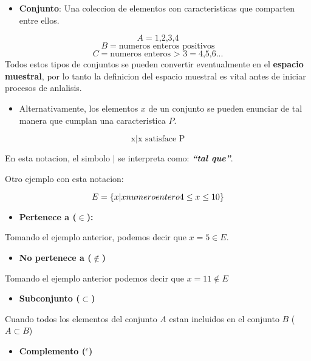 \documentclass[]{book}
\providecommand{\tightlist}{%
  \setlength{\itemsep}{0pt}\setlength{\parskip}{0pt}}
\begin{document}
\begin{itemize}
\tightlist
\item
  \textbf{Conjunto}: Una coleccion de elementos con caracteristicas que
  comparten entre ellos.
\end{itemize}

\[A=\text{{1,2,3,4}}\] \[B = \text{{numeros enteros positivos}}\]
\[ C = \text{{numeros enteros > 3}} = \text{{4,5,6...}}\] Todos estos
tipos de conjuntos se pueden convertir eventualmente en el
\textbf{espacio muestral}, por lo tanto la definicion del espacio
muestral es vital antes de iniciar procesos de anlalisis.

\begin{itemize}
\tightlist
\item
  Alternativamente, los elementos \(x\) de un conjunto se pueden
  enunciar de tal manera que cumplan una caracteristica \(P\).
\end{itemize}

\[\text{{x|x satisface P}}\]

En esta notacion, el simbolo \emph{\(|\)} se interpreta como:
\textbf{\emph{``tal que''}}.

Otro ejemplo con esta notacion:

\[ E = \{x|x \space numero\space entero\space 4 \leq x \leq 10\}\]

\begin{itemize}
\tightlist
\item
  \textbf{Pertenece a (\(\in\)):}
\end{itemize}

Tomando el ejemplo anterior, podemos decir que \(x = 5 \in E\).

\begin{itemize}
\tightlist
\item
  \textbf{No pertenece a (\(\notin\))}
\end{itemize}

Tomando el ejemplo anterior podemos decir que \(x = 11 \notin E\)

\begin{itemize}
\tightlist
\item
  \textbf{Subconjunto (\(\subset\))}
\end{itemize}

Cuando todos los elementos del conjunto \(A\) estan incluidos en el
conjunto \(B\) (\(A \subset B\))

\begin{itemize}
\tightlist
\item
  \textbf{Complemento (\(^c\))}
\end{itemize}
\end{document}
